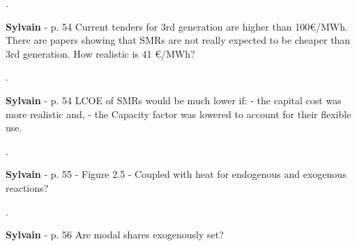 \documentclass[12pt,a4paper]{article}
\begin{document}
\noindent {\color{blue} }.

\begin{mdframed}[style=manuscript] %

\end{mdframed}

\begin{mdframed}[style=comment] %
{\color{purple} \textbf{Sylvain}} - p. 54 Current tenders for 3rd generation are higher than 100€/MWh. There are papers showing that SMRs are not really expected to be cheaper than 3rd generation. How realistic is 41 €/MWh?
\end{mdframed}

\noindent {\color{blue} }.

\begin{mdframed}[style=manuscript] %

\end{mdframed}

\begin{mdframed}[style=comment] %
{\color{purple} \textbf{Sylvain}} - p. 54 LCOE of SMRs would be much lower if: - the capital cost was more realistic and, - the Capacity factor was lowered to account for their flexible use.
\end{mdframed}

\noindent {\color{blue} }.

\begin{mdframed}[style=manuscript] %

\end{mdframed}

\begin{mdframed}[style=comment] %
{\color{purple} \textbf{Sylvain}} - p. 55 - Figure 2.5 - Coupled with heat for endogenous and exogenous reactions?
\end{mdframed}

\noindent {\color{blue} }.

\begin{mdframed}[style=manuscript] %

\end{mdframed}

\begin{mdframed}[style=comment] %
{\color{purple} \textbf{Sylvain}} - p. 56 Are modal shares exogenously set?
\end{mdframed}
\end{document}
